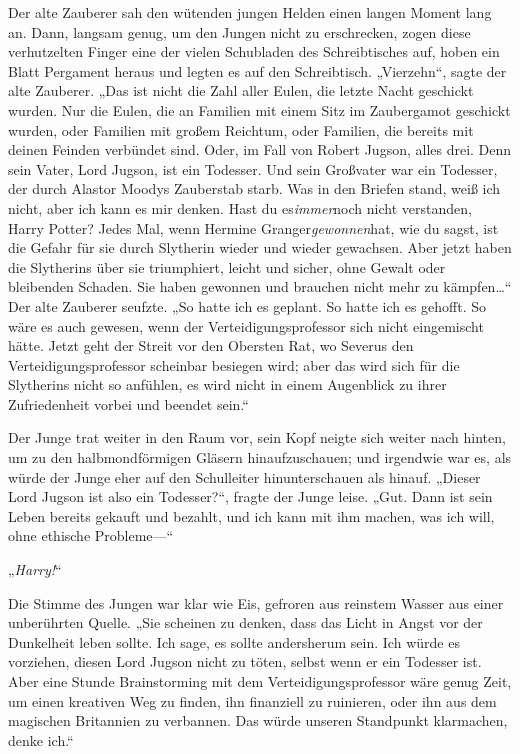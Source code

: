 {Der alte Zauberer sah den wütenden jungen Helden einen langen Moment lang an. Dann, langsam genug, um den Jungen nicht zu erschrecken, zogen diese verhutzelten Finger eine der vielen Schubladen des Schreibtisches auf, hoben ein Blatt Pergament heraus und legten es auf den Schreibtisch. „Vierzehn“, sagte der alte Zauberer. „Das ist nicht die Zahl aller Eulen, die letzte Nacht geschickt wurden. Nur die Eulen, die an Familien mit einem Sitz im Zaubergamot geschickt wurden, oder Familien mit großem Reichtum, oder Familien, die bereits mit deinen Feinden verbündet sind. Oder, im Fall von Robert Jugson, alles drei. Denn sein Vater, Lord Jugson, ist ein Todesser. Und sein Großvater war ein Todesser, der durch Alastor Moodys Zauberstab starb. Was in den Briefen stand, weiß ich nicht, aber ich kann es mir denken. Hast du es\emph{immer}noch nicht verstanden, Harry Potter? Jedes Mal, wenn Hermine Granger\emph{gewonnen}hat, wie du sagst, ist die Gefahr für sie durch Slytherin wieder und wieder gewachsen. Aber jetzt haben die Slytherins über sie triumphiert, leicht und sicher, ohne Gewalt oder bleibenden Schaden. Sie haben gewonnen und brauchen nicht mehr zu kämpfen…“ Der alte Zauberer seufzte. „So hatte ich es geplant. So hatte ich es gehofft. So wäre es auch gewesen, wenn der Verteidigungsprofessor sich nicht eingemischt hätte. Jetzt geht der Streit vor den Obersten Rat, wo Severus den Verteidigungsprofessor scheinbar besiegen wird; aber das wird sich für die Slytherins nicht so anfühlen, es wird nicht in einem Augenblick zu ihrer Zufriedenheit vorbei und beendet sein.“

Der Junge trat weiter in den Raum vor, sein Kopf neigte sich weiter nach hinten, um zu den halbmondförmigen Gläsern hinaufzuschauen; und irgendwie war es, als würde der Junge eher auf den Schulleiter hinunterschauen als hinauf. „Dieser Lord Jugson ist also ein Todesser?“, fragte der Junge leise. „Gut. Dann ist sein Leben bereits gekauft und bezahlt, und ich kann mit ihm machen, was ich will, ohne ethische Probleme—“

„\emph{Harry!}“

Die Stimme des Jungen war klar wie Eis, gefroren aus reinstem Wasser aus einer unberührten Quelle. „Sie scheinen zu denken, dass das Licht in Angst vor der Dunkelheit leben sollte. Ich sage, es sollte andersherum sein. Ich würde es vorziehen, diesen Lord Jugson nicht zu töten, selbst wenn er ein Todesser ist. Aber eine Stunde Brainstorming mit dem Verteidigungsprofessor wäre genug Zeit, um einen kreativen Weg zu finden, ihn finanziell zu ruinieren, oder ihn aus dem magischen Britannien zu verbannen. Das würde unseren Standpunkt klarmachen, denke ich.“

}

